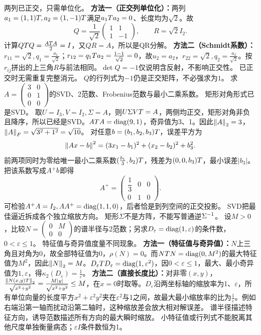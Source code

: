 {两列已正交，只需单位化。}
{\textbf{方法一（正交列单位化）：}两列$a_1=(1,1)T,a_2=(1,-1)T$满足$a_1T a_2=0$、长度均为$\sqrt2$。故
\[Q=\dfrac1{\sqrt2}\begin{pmatrix}1&1\\1&-1\end{pmatrix},\qquad R=\sqrt2 I_2.\]
计算$QT Q=\frac{AT A}{2}=I$，又$QR=A$，所以是QR分解。
\textbf{方法二（Schmidt系数）：}$r_{11}=\sqrt2,q_1=\frac{a_1}{\sqrt2}$；$r_{12}=q_1T a_2=\frac{1-1}{\sqrt2}=0$，故$u_2=a_2$，$r_{22}=\sqrt2,q_2=\frac{a_2}{\sqrt2}$。按$r_{ij}$拼出的上三角$R$与前法相同。$\det Q=-1$仅说明含反射，不影响正交性。}
{已正交时无需重复完整消元。}
{$Q$的行列式为$-1$仍是正交矩阵，不必强求为$1$。}
{求$A=\begin{pmatrix}3&0\\0&1\\0&0\end{pmatrix}$的SVD、2范数、Frobenius范数与最小二乘系数。}
{矩形对角形式已是SVD。}
{取$U=I_3,V=I_2,\Sigma=A$，则$U\Sigma VT=A$，两侧均正交，矩形对角非负且降序，所以已经是SVD。$AT A=\operatorname{diag}(9,1)$，奇异值为3、1。因此$\left\lVert A\right\rVert_2=3$，$\left\lVert A\right\rVert_F=\sqrt{3^2+1^2}=\sqrt{10}$。
对任意$b=(b_1,b_2,b_3)T$，误差平方为
\[\left\lVert Ax-b\right\rVert^2=(3x_1-b_1)^2+(x_2-b_2)^2+b_3^2.\]
前两项同时为零给唯一最小二乘系数$(\frac{b_1}{3},b_2)T$，残差为$(0,0,b_3)T$，最小误差$|b_3|$。把该系数写成$A^+b$即得
\[A^+=\begin{pmatrix}\dfrac{1}{3}&0&0\\0&1&0\end{pmatrix}.\]
可检验$A^+A=I_2,AA^+=\operatorname{diag}(1,1,0)$，后者恰是到列空间的正交投影。}
{SVD把最佳逼近拆成各个独立缩放方向。}
{矩形$\Sigma$不是方阵，不能写普通逆$\Sigma^{-1}$。}
{设$M>0$，比较$N=\begin{pmatrix}0&M\\0&0\end{pmatrix}$的谱半径与2范数；另求$D_\varepsilon=\operatorname{diag}(1,\varepsilon)$的条件数，$0<\varepsilon\le1$。}
{特征值与奇异值度量不同现象。}
{\textbf{方法一（特征值与奇异值）：}$N$上三角且对角为0，故全部特征值为0，$\rho(N)=0$。而$NT N=\operatorname{diag}(0,M^2)$的最大特征值为$M^2$，因此$\left\lVert N\right\rVert_2=M$。$D_\varepsilon T D_\varepsilon=\operatorname{diag}(1,\varepsilon^2)$，因$0<\varepsilon\le1$，最大、最小奇异值为$1,\varepsilon$，得$\kappa_2(D_\varepsilon)=\frac{1}{\varepsilon}$。
\textbf{方法二（直接长度比）：}对非零$(x,y)$，$\frac{\left\lVert N(x,y)T\right\rVert_2}{\sqrt{x^2+y^2}}=\frac{M|y|}{\sqrt{x^2+y^2}}\le M$，在$x=0$时取等。$D_\varepsilon$沿两坐标轴的缩放率为1、$\varepsilon$，所有单位向量的长度平方$x^2+\varepsilon^2y^2$夹在$\varepsilon^2$与1之间，故最大最小缩放率的比为$\frac{1}{\varepsilon}$。例如右端沿第一轴而扰动沿第二轴时，这种缩放差会放大相对解误差。}
{谱半径描述特征方向，诱导范数描述所有方向的最大瞬时缩放。}
{小特征值或行列式不能脱离其他尺度单独衡量病态；$\varepsilon I$条件数恒为1。}


